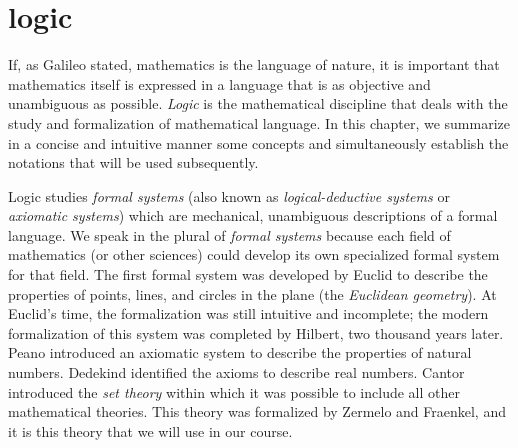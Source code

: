 \section{logic}

If, as Galileo stated, mathematics is the language of nature, it is important
that mathematics itself is expressed in a language that is as objective and
unambiguous as possible. \emph{Logic} is the mathematical discipline that deals
with the study and formalization of mathematical language. In this chapter, we
summarize in a concise and intuitive manner some concepts and simultaneously
establish the notations that will be used subsequently.

Logic studies \emph{formal systems}%
%
 (also known as \emph{logical-deductive systems} or \emph{axiomatic systems}) which are mechanical, unambiguous descriptions of a formal language. We speak in the plural of \emph{formal systems} because each field of mathematics (or other sciences) could develop its own specialized formal system for that field. The first formal system was developed by Euclid to describe the properties of points, lines, and circles in the plane (the \emph{Euclidean geometry}). At Euclid's time, the formalization was still intuitive and incomplete; the modern formalization of this system was completed by Hilbert, two thousand years later. Peano introduced an axiomatic system to describe the properties of natural numbers. Dedekind identified the axioms to describe real numbers. Cantor introduced the \emph{set theory} within which it was possible to include all other mathematical theories. This theory was formalized by Zermelo and Fraenkel, and it is this theory that we will use in our course.

